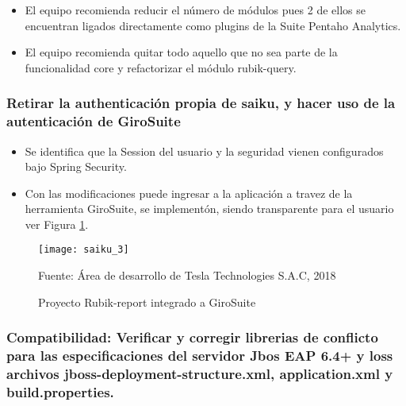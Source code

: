 \begin{spacing}{1.5}
\begin{itemize}
\begin{itemize}
					\item El equipo recomienda reducir el n\'{u}mero de m\'{o}dulos pues 2 de ellos se encuentran ligados directamente como plugins de la Suite Pentaho Analytics.
					\item El equipo recomienda quitar todo aquello que no sea parte de la funcionalidad core y refactorizar el m\'{o}dulo rubik-query.
				\end{itemize}	
		\end{itemize}

		\subsubsection{Retirar la authenticación propia de saiku, y hacer uso de la autenticación de GiroSuite}
		
		\begin{itemize}
			\item Se identifica que la Session  del usuario y la seguridad vienen configurados bajo Spring Security.
			\item Con las modificaciones puede ingresar a la aplicaci\'{o}n a travez de la herramienta GiroSuite, se implement\'{o}n, siendo transparente para el usuario ver Figura \ref{figure:chaperIII_6}.
		\end{itemize}
		
		\begin{figure}[H]
			\centering
			\texttt{[image: saiku\_3]}
			\caption {\centering \small{Proyecto Rubik-report integrado a GiroSuite}} \label{figure:chaperIII_6}
			\small {Fuente: \'{A}rea de desarrollo de Tesla Technologies S.A.C, 2018}
		\end{figure}	
			
		\subsubsection{Compatibilidad: Verificar y corregir librerias de conflicto para las especificaciones del servidor Jbos EAP 6.4+ y loss archivos jboss-deployment-structure.xml, application.xml y build.properties.}
		

\end{spacing}

